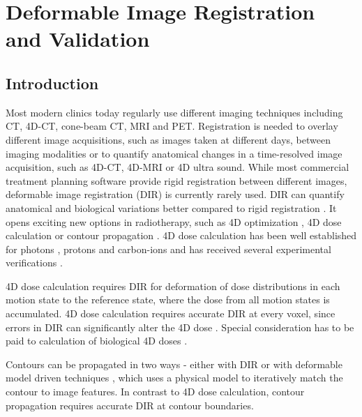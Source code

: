 
\chapter{Deformable Image Registration and Validation}
\label{chapter:vmm}
\minitoc

\section{Introduction}


Most modern clinics today regularly use different imaging techniques including CT, 4D-CT, cone-beam CT, MRI and PET. Registration is needed to overlay different image acquisitions, such as images taken at different days,
between imaging modalities or to quantify anatomical changes in a time-resolved image acquisition, such as 4D-CT, 4D-MRI or 4D ultra sound. While most commercial treatment planning software provide rigid registration between different images, deformable image registration (DIR) is currently rarely used. 
DIR can quantify anatomical and biological variations better compared to rigid registration \cite{Sarrut2006}. It opens exciting new options in radiotherapy, such as 4D optimization \cite{Trofimov2005}, 
4D dose calculation \cite{Flampouri2006} or contour propagation \cite{Lu2006b}. 4D dose calculation has been well established for photons \cite{Ong2016}, protons \cite{Paganetti2005} and carbon-ions \cite{Gemmel2011} and has received
several experimental verifications \cite{Vinogradskiy2009, Perrin2016, Bert2012a}. 

4D dose calculation requires DIR for deformation of dose distributions in each motion state
to the reference state, where the dose from all motion states is accumulated. 4D dose calculation requires accurate DIR at every voxel, since errors in DIR can significantly alter the 4D dose \cite{Heath2006}. Special consideration has to be paid to calculation of biological 4D doses \cite{Gemmel2011}. 

Contours can be propagated in two ways - either with DIR \cite{Lu2006a, Rietzel2005a} or
with deformable model driven techniques \cite{McInerney1996}, which uses a physical model to iteratively match the contour to image features. In contrast to 4D dose calculation, contour propagation requires accurate DIR at contour boundaries.

